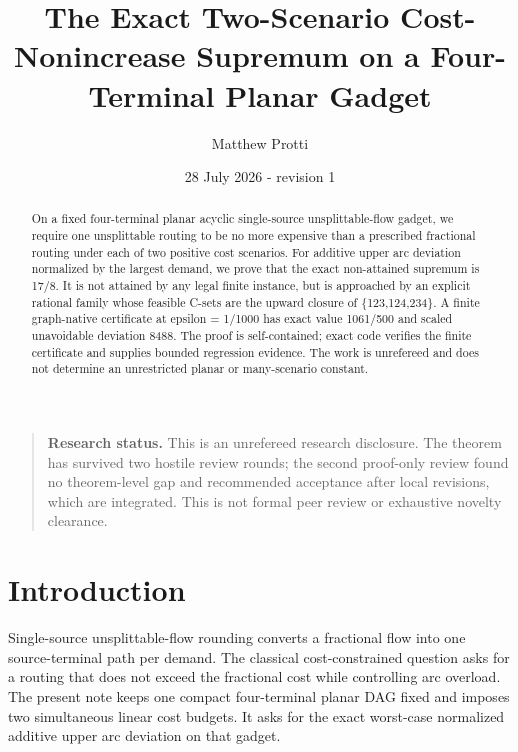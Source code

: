 \documentclass[
  11pt,
]{article}
\title{The Exact Two-Scenario Cost-Nonincrease Supremum on a
Four-Terminal Planar Gadget}
\author{Matthew Protti}
\date{28 July 2026 - revision 1}
\begin{document}
\maketitle
\begin{abstract}
On a fixed four-terminal planar acyclic single-source unsplittable-flow
gadget, we require one unsplittable routing to be no more expensive than
a prescribed fractional routing under each of two positive cost
scenarios. For additive upper arc deviation normalized by the largest
demand, we prove that the exact non-attained supremum is 17/8. It is not
attained by any legal finite instance, but is approached by an explicit
rational family whose feasible C-sets are the upward closure of
\{123,124,234\}. A finite graph-native certificate at epsilon = 1/1000
has exact value 1061/500 and scaled unavoidable deviation 8488. The
proof is self-contained; exact code verifies the finite certificate and
supplies bounded regression evidence. The work is unrefereed and does
not determine an unrestricted planar or many-scenario constant.
\end{abstract}
\begin{center}
\end{center}

{
\setcounter{tocdepth}{3}
\tableofcontents
}
\begin{quote}
\textbf{Research status.} This is an unrefereed research disclosure. The
theorem has survived two hostile review rounds; the second proof-only
review found no theorem-level gap and recommended acceptance after local
revisions, which are integrated. This is not formal peer review or
exhaustive novelty clearance.
\end{quote}

\section{Introduction}\label{introduction}

Single-source unsplittable-flow rounding converts a fractional flow into
one source-terminal path per demand. The classical cost-constrained
question asks for a routing that does not exceed the fractional cost
while controlling arc overload. The present note keeps one compact
four-terminal planar DAG fixed and imposes two simultaneous linear cost
budgets. It asks for the exact worst-case normalized additive upper arc
deviation on that gadget.
\end{document}
